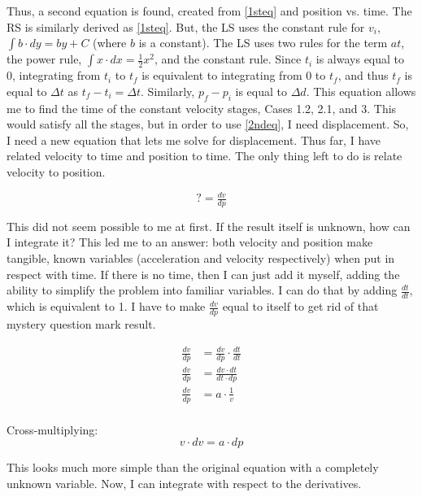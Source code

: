 \documentclass[11pt]{article}
\begin{document}
Thus, a second equation is found, created from \eqref{1steq} and position vs. time. The RS is similarly derived as \eqref{1steq}. But, the LS uses the constant rule for $v_i$, $\int b \cdot dy = by + C$ (where $b$ is a constant). The LS uses two rules for the term $at$, the power rule, $\int x \cdot dx = \tfrac{1}{2}x^2$, and the constant rule. Since $t_i$ is always equal to 0, integrating from $t_i$ to $t_f$ is equivalent to integrating from $0$ to $t_f$, and thus $t_f$ is equal to $\Delta t$ as $t_f - t_i = \Delta t$. Similarly, $p_f - p_i$ is equal to $\Delta d$.
This equation allows me to find the time of the constant velocity stages, Cases 1.2, 2.1, and 3. This would satisfy all the stages, but in order to use \eqref{2ndeq}, I need displacement. So, I need a new equation that lets me solve for displacement. Thus far, I have related velocity to time and position to time. The only thing left to do is relate velocity to position. 

\begin{equation*}
    ? = \tfrac{dv}{dp}
\end{equation*}

This did not seem possible to me at first. If the result itself is unknown, how can I integrate it? This led me to an answer: both velocity and position make tangible, known variables (acceleration and velocity respectively) when put in respect with time. If there is no time, then I can just add it myself, adding the ability to simplify the problem into familiar variables. I can do that by adding $\tfrac{dt}{dt}$, which is equivalent to 1. I have to make $\tfrac{dv}{dp}$ equal to itself to get rid of that mystery question mark result. 

\begin{align*}
    \frac{dv}{dp} &= \frac{d{v}}{dp} \cdot \frac{dt}{dt} \\
    \frac{d{v}}{dp} &= \frac{d{v} \cdot dt}{dt \cdot dp} \\
    \frac{d{v}}{dp} &= {a} \cdot \frac{1}{{v}} \\
\end{align*}

\vspace{-0.75cm}

Cross-multiplying:
\begin{equation*}
    {v} \cdot d{v} = {a} \cdot dp
\end{equation*}

This looks much more simple than the original equation with a completely unknown variable. Now, I can integrate with respect to the derivatives. 
\end{document}
